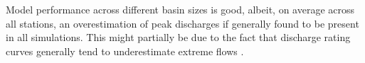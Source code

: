 Model performance across different basin sizes is good, albeit, on average across all stations, an overestimation of peak discharges if generally found to be present in all simulations.
This might partially be due to the fact that discharge rating curves generally tend to underestimate extreme flows \citep{DiBaldassarre2009}.
